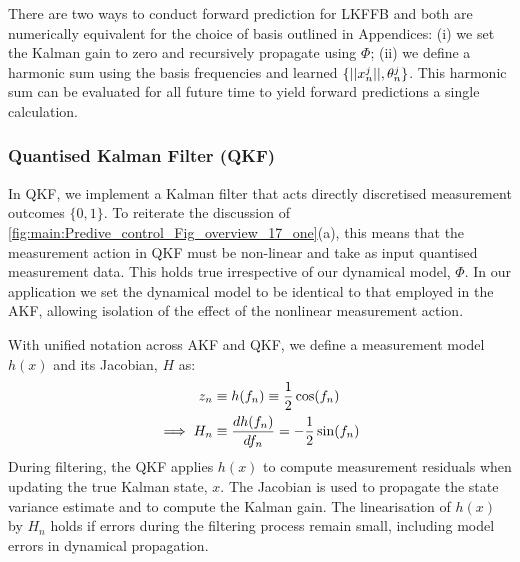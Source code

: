 There are two ways to conduct forward prediction for LKFFB and both are numerically equivalent for the choice of basis outlined in Appendices: (i) we set the Kalman gain to zero and recursively propagate using $\Phi$; (ii) we define a harmonic sum using the basis frequencies and learned $\{||x^j_n||, \theta^{j}_{n} \}$.  This harmonic sum can be evaluated for all future time to yield forward predictions a single calculation. 





\subsubsection{Quantised Kalman Filter (QKF)}

In QKF, we implement a Kalman filter that acts directly discretised measurement outcomes $\{0,1\}$. To reiterate the discussion of  \cref{fig:main:Predive_control_Fig_overview_17_one}(a), this means that the measurement action in QKF must be non-linear and take as input quantised measurement data. This holds true irrespective of our dynamical model, $\Phi$.  In our application we set the dynamical model to be identical to that employed in the AKF, allowing isolation of the effect of the nonlinear measurement action.

With unified notation across AKF and QKF, we define a measurement model $h(x)$ and its Jacobian, $H$ as:
\begin{align}
z_n &  \equiv h(f_n) \equiv \frac{1}{2}\cos(f_{n}) \\
\implies H_n &\equiv \frac{d h(f_n)}{df_n} =  -\frac{1}{2}\sin(f_{n})
\end{align}
During filtering, the QKF applies $h(x)$ to compute measurement residuals when updating the true Kalman state, $x$. The Jacobian is used to propagate the state variance estimate and to compute the Kalman gain. The linearisation of $h(x)$ by $H_n$ holds if errors during the filtering process remain small, including model errors in dynamical propagation. 

